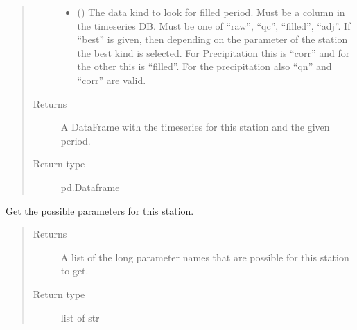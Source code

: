 \documentclass[letterpaper,10pt,english]{sphinxmanual}
\begin{document}
\begin{fulllineitems}
\begin{fulllineitems}
\begin{quote}
\begin{description}
\begin{itemize}
\item {} 
\sphinxAtStartPar
{} () \textendash{} The data kind to look for filled period.
Must be a column in the timeseries DB.
Must be one of “raw”, “qc”, “filled”, “adj”.
If “best” is given, then depending on the parameter of the station the best kind is selected.
For Precipitation this is “corr” and for the other this is “filled”.
For the precipitation also “qn” and “corr” are valid.

\end{itemize}

\item[{Returns}] \leavevmode
\sphinxAtStartPar
A DataFrame with the timeseries for this station and the given period.

\item[{Return type}] \leavevmode
\sphinxAtStartPar
pd.Dataframe

\end{description}\end{quote}

\end{fulllineitems}


\begin{fulllineitems}
\label{\detokenize{weatherDB:weatherDB.station.GroupStation.get_possible_paras}}
\sphinxAtStartPar
Get the possible parameters for this station.
\begin{quote}\begin{description}
\item[{Returns}] \leavevmode
\sphinxAtStartPar
A list of the long parameter names that are possible for this station to get.

\item[{Return type}] \leavevmode
\sphinxAtStartPar
list of str

\end{description}\end{quote}

\end{fulllineitems}


\end{fulllineitems}

\end{document}
